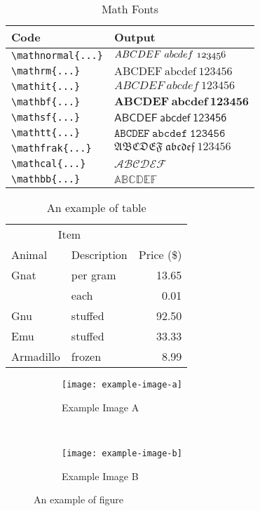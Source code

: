 \documentclass[conference]{IEEEtran}
\begin{document}
\begin{table}[t]
  \centering
  \begin{tabular}{ll}
    \toprule
    \textbf{Code}          & \textbf{Output}                     \\
    \midrule
    \verb|\mathnormal{...}| & $\mathnormal{ABCDEF~abcdef~123456}$ \\
    \verb|\mathrm{...}| & $\mathrm{ABCDEF~abcdef~123456}$     \\
    \verb|\mathit{...}| & $\mathit{ABCDEF~abcdef~123456}$     \\
    \verb|\mathbf{...}| & $\mathbf{ABCDEF~abcdef~123456}$     \\
    \verb|\mathsf{...}| & $\mathsf{ABCDEF~abcdef~123456}$     \\
    \verb|\mathtt{...}| & $\mathtt{ABCDEF~abcdef~123456}$     \\
    \verb|\mathfrak{...}| & $\mathfrak{ABCDEF~abcdef~123456}$   \\
    \verb|\mathcal{...}| & $\mathcal{ABCDEF}$                  \\
    \verb|\mathbb{...}| & $\mathbb{ABCDEF}$                   \\
    \bottomrule
  \end{tabular}
  \caption{Math Fonts}\label{tab:math-fonts}
\end{table}

\begin{table}[t]
  \centering
  \begin{tabular}{llr}
    \toprule
    \multicolumn{2}{c}{Item}             \\
    \cmidrule(r){1-2}
    Animal    & Description & Price (\$) \\
    \midrule
    Gnat      & per gram    & 13.65      \\
              & each        & 0.01       \\
    Gnu       & stuffed     & 92.50      \\
    Emu       & stuffed     & 33.33      \\
    Armadillo & frozen      & 8.99       \\
    \bottomrule
  \end{tabular}
  \caption{An example of table}\label{tab:example}
\end{table}

\begin{figure*}[t]
  \centering
  \begin{subfigure}[b]{0.45\linewidth}
    \texttt{[image: example-image-a]}
    \caption{Example Image A}\label{fig:example:a}
  \end{subfigure}
  ~%
  \begin{subfigure}[b]{0.45\linewidth}
    \texttt{[image: example-image-b]}
    \caption{Example Image B}\label{fig:example:b}
  \end{subfigure}
  \caption{An example of figure}\label{fig:example}
\end{figure*}
\end{document}
